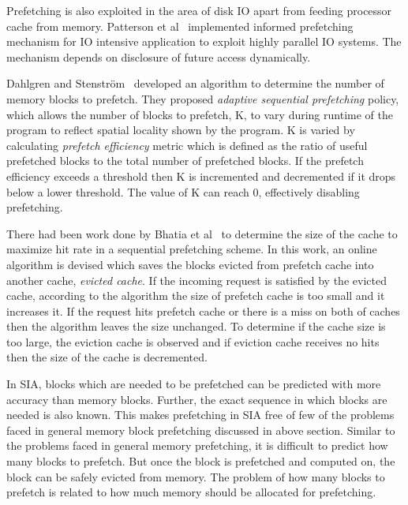 Prefetching is also exploited in the area of disk IO apart from feeding processor cache
from memory. Patterson et al~\cite{Patterson1994} implemented informed prefetching
mechanism for IO intensive application to exploit highly parallel IO systems. The
mechanism depends on disclosure of future access dynamically.

Dahlgren and Stenström~\cite{Dahlgren1993} developed an algorithm to determine the
number of memory blocks to prefetch. They proposed
\textit{adaptive sequential prefetching} policy, which allows the number of blocks
to prefetch, K, to vary during runtime of the program to reflect spatial locality
shown by the program. K is varied by calculating \textit{prefetch efficiency} metric
which is defined as the ratio of useful prefetched blocks to the total number of
prefetched blocks. If the prefetch efficiency exceeds a threshold then K is
incremented and decremented if it drops below a lower threshold. The value of K
can reach 0, effectively disabling prefetching.

There had been work done by Bhatia et al~\cite{Bhatia2010} to determine the size of
the cache to maximize hit rate in a sequential prefetching scheme. In this work, an
online algorithm is devised which saves the blocks evicted from prefetch cache
into another cache, \textit{evicted cache}. If the incoming request is satisfied
by the evicted cache, according to the algorithm the size of prefetch cache is too
small and it increases it. If the request hits prefetch cache or there is a miss
on both of caches then the algorithm leaves the size unchanged. To determine if
the cache size is too large, the eviction cache is observed and if eviction cache
receives no hits then the size of the cache is decremented.

In SIA, blocks which are needed to be prefetched can be predicted with more accuracy
than memory blocks. Further, the exact sequence in which blocks are needed is also known.
This makes prefetching in SIA free of few of the problems faced in general memory
block prefetching discussed in above section. Similar to the problems faced in general
memory prefetching, it is difficult to predict how many blocks to prefetch. But
once the block is prefetched and computed on, the block can be safely evicted from
memory. The problem of how many blocks to prefetch is related to how much memory
should be allocated for prefetching.
